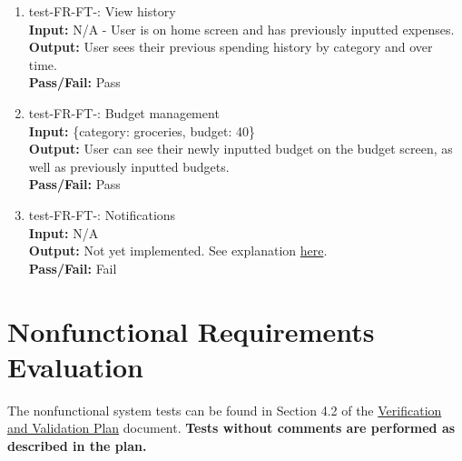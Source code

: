 \documentclass[12pt, titlepage]{article}
\begin{document}
\begin{enumerate}
  \item test-FR-FT-: View history\\
    \textbf{Input:} N/A - User is on home screen and has previously inputted
    expenses.\\
    \textbf{Output:} User sees their previous spending history by category and
    over time.\\
    \textbf{Pass/Fail:} Pass\\
  \item test-FR-FT-: Budget management\\
    \textbf{Input:} \{category: groceries, budget: 40\}\\
    \textbf{Output:} User can see their newly inputted budget on the budget
    screen, as well as previously inputted budgets.\\
    \textbf{Pass/Fail:} Pass\\
  \item test-FR-FT-: Notifications\\
    \textbf{Input:} N/A\\
    \textbf{Output:} Not yet implemented. See explanation
    \href{https://github.com/PlutosCapstone/Plutos/issues/266#issuecomment-2779557067}{here}.\\
    \textbf{Pass/Fail:} Fail\\
\end{enumerate}


\section{Nonfunctional Requirements Evaluation}

The nonfunctional system tests can be found in Section 4.2 of the
\href{https://github.com/PlutosCapstone/Plutos/blob/main/docs/VnVPlan/VnVPlan.pdf}{Verification
and Validation Plan} document. \textbf{Tests without comments are performed as
described in the plan.}
\end{document}
